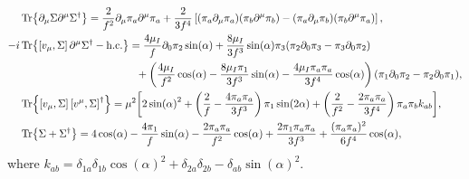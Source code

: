 \documentclass{article}
\begin{document}
\begin{align*}
    & \Tr{\partial_\mu \Sigma \partial^\mu \Sigma^\dagger}
    = \frac{2}{f^2} \partial_\mu \pi_a \partial^\mu \pi_a
    + \frac{2}{3f^4}
    \left[
        (\pi_a\partial_\mu \pi_a)(\pi_b\partial^\mu \pi_b)
        -        
        (\pi_a\partial_\mu \pi_b)(\pi_b\partial^\mu \pi_a)
    \right], \\
    -i  &\Tr{\left[v_\mu, \Sigma \right]\partial^\mu\Sigma^\dagger - \mathrm{h.c.}}
     =
    \frac{4 \mu_I}{f} \partial_0\pi_2 \sin(\alpha)
    + \frac{8 \mu_I}{3f^3}\sin(\alpha) \pi_3(
        \pi_2 \partial_0 \pi_3 - \pi_3 \partial_0 \pi_2
        )
    \\ & \quad \quad \quad \quad \quad \quad \quad \quad \quad \quad \quad
    +
    \left(
        \frac{4\mu_I}{f^2} \cos(\alpha)
        - \frac{8 \mu_I\pi_1}{3f^3} \sin(\alpha)
        - \frac{4 \mu_I \pi_a \pi_a} {3f^4}\cos(\alpha) 
    \right) 
    (\pi_1\partial_0 \pi_2 - \pi_2 \partial_0 \pi_1), \\
    & \Tr{\left[v_\mu, \Sigma \right]\left[v^\mu, \Sigma \right]^\dagger}
    = \mu^2
    \bigg[
        2 \sin(\alpha)^2
        +
        \left(
            \frac{2}{f} 
            - \frac{4\pi_a \pi_a}{3 f^3} 
        \right)
        \pi_1  \sin(2\alpha)
        + \left(
            \frac{2}{f^2}
            - \frac{2 \pi_a \pi_a}{3 f^4} 
        \right)
        \pi_a \pi_b k_{ab}
    \bigg], 
    \\
    & \Tr{\Sigma + \Sigma^\dagger}
    = 4 \cos(\alpha) 
    - \frac{4 \pi_1}{f} \sin(\alpha) 
    - \frac{2 \pi_a \pi_a}{f^2} \cos(\alpha)
    + \frac{2 \pi_1 \pi_a \pi_a}{3 f^3} 
    + \frac{(\pi_a \pi_a)^2}{6 f^4}\cos(\alpha), 
    \end{align*}
where $k_{ab} =\delta_{1a} \delta_{1b} \cos(\alpha)^2  + \delta_{2a}\delta_{2b} - \delta_{ab} \sin(\alpha)^2$.
\end{document}
